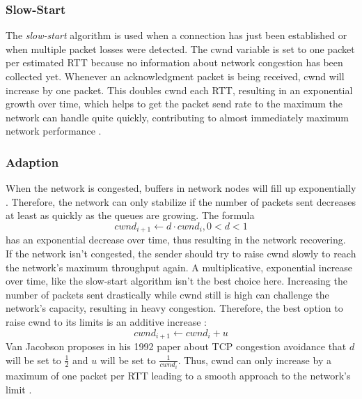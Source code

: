 \documentclass[a4paper,conference]{IEEEtran}
\begin{document}
\subsubsection*{Slow-Start}
The \textit{slow-start} algorithm is used when a connection has just been established or when multiple packet losses were detected. The cwnd variable is set to one packet per estimated RTT because no information about network congestion has been collected yet. Whenever an acknowledgment packet is being received, cwnd will increase by one packet. This doubles cwnd each RTT, resulting in an exponential growth over time, which helps to get the packet send rate to the maximum the network can handle quite quickly, contributing to almost immediately maximum network performance \cite{jacobson1992tcp}.

\subsubsection*{Adaption}
When the network is congested, buffers in network nodes will fill up exponentially \cite{jacobson1992tcp}. Therefore, the network can only stabilize if the number of packets sent decreases at least as quickly as the queues are growing. The formula \cite{jacobson1992tcp} \[cwnd_{i+1} \leftarrow d \cdot cwnd_{i}, 0<d<1\] has an exponential decrease over time, thus resulting in the network recovering.\\
If the network isn't congested, the sender should try to raise cwnd slowly to reach the network's maximum throughput again. A multiplicative, exponential increase over time, like the slow-start algorithm isn't the best choice here. Increasing the number of packets sent drastically while cwnd still is high can challenge the network's capacity, resulting in heavy congestion. Therefore, the best option to raise cwnd to its limits is an additive increase \cite{jacobson1992tcp}:\[cwnd_{i+1} \leftarrow cwnd_{i} + u\] Van Jacobson proposes in his 1992 paper about TCP congestion avoidance that $d$ will be set to $\frac{1}{2}$ and $u$ will be set to $\frac{1}{cwnd_{i}}$. Thus, cwnd can only increase by a maximum of one packet per RTT leading to a smooth approach to the network's limit \cite{jacobson1992tcp}.
\end{document}
